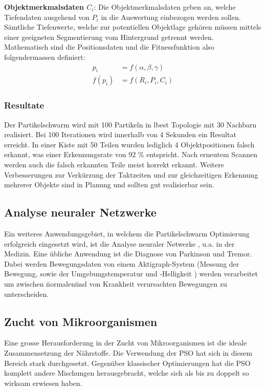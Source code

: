\textbf{Objektmerkmalsdaten $C_i$}: Die Objektmerkmalsdaten geben an, welche Tiefendaten ausgehend von $P_i$ in die Auswertung einbezogen werden sollen. Sämtliche Tiefenwerte, welche zur potentiellen Objektlage gehören müssen mittels einer geeigneten Segmentierung vom Hintergrund getrennt werden. \\

Mathematisch sind die Positionsdaten und die Fitnessfunktion also folgendermassen definiert: 
\begin{align}
	p_i &= f(\alpha ,\beta ,\gamma) \\
	f(p_i) &= f(R_i,P_i,C_i)
\end{align}

\subsubsection{Resultate}
Der Partikelschwarm wird mit 100 Partikeln in lbest Topologie mit 30 Nachbarn realisiert. Bei 100 Iterationen wird innerhalb von 4 Sekunden ein Resultat erreicht. In einer Kiste mit 50 Teilen wurden lediglich 4 Objektpositionen falsch erkannt, was einer Erkennungsrate von 92 \% entspricht. Nach erneutem Scannen werden auch die falsch erkannten Teile meist korrekt erkannt. Weitere Verbesserungen zur Verkürzung der Taktzeiten und zur gleichzeitigen Erkennung  mehrerer Objekte sind in Planung und sollten gut realisierbar sein.

\subsection{Analyse neuraler Netzwerke}
Ein weiteres Anwendungsgebiet, in welchem die Partikelschwarm Optimierung erfolgreich eingesetzt wird, ist die Analyse neuraler Netwerke , u.a. in der Medizin. Eine übliche Anwendung ist die Diagnose von Parkinson und Tremor. Dabei werden Bewegungsdaten von einem Aktigraph-System (Messung der Bewegung, sowie der Umgebungstemperatur und -Helligkeit ) werden verarbeitet um zwischen \"normalen\" und von Krankheit verursachten Bewegungen zu unterscheiden. \cite{Shi-Appl}

\subsection{Zucht von Mikroorganismen}
Eine grosse Herausforderung in der Zucht von Mikroorganismen ist die ideale Zusammensetzung der Nährstoffe. Die Verwendung der PSO hat sich in diesem Bereich stark durchgesetzt. Gegenüber klassischer Optimierungen hat die PSO komplett andere Mischungen herausgebracht, welche sich als bis zu doppelt so wirksam erwiesen haben. \cite{Shi-Appl}